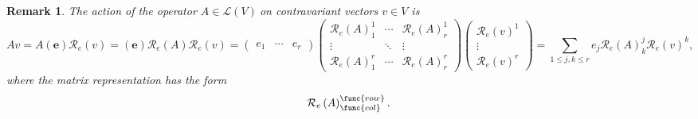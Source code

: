 \documentclass[aps,preprint]{revtex4}
\newtheorem{remark}[theorem]{Remark}
\begin{document}
\begin{remark}
The action of the operator $A\in \mathcal{L}\left( V\right) \ $on
contravariant vectors $v\in V$ is 
\begin{equation}
Av=A\left( \boldsymbol{e}\right) \mathcal{R}_{e}\left( v\right) =\left( 
\boldsymbol{e}\right) \mathcal{R}_{e}\left( A\right) \mathcal{R}_{e}\left(
v\right) =\left( 
\begin{array}{ccc}
e_{1} & \cdots & e_{r}%
\end{array}%
\right) \left( 
\begin{array}{ccc}
\mathcal{R}_{e}\left( A\right) _{1}^{1} & \cdots & \mathcal{R}_{e}\left(
A\right) _{r}^{1} \\ 
\vdots & \ddots & \vdots \\ 
\mathcal{R}_{e}\left( A\right) _{1}^{r} & \cdots & \mathcal{R}_{e}\left(
A\right) _{r}^{r}%
\end{array}%
\right) \left( 
\begin{array}{c}
\mathcal{R}_{e}\left( v\right) ^{1} \\ 
\vdots \\ 
\mathcal{R}_{e}\left( v\right) ^{r}%
\end{array}%
\right) =\sum_{1\leq j,k\leq r}e_{j}\mathcal{R}_{e}\left( A\right) _{k}^{j}%
\mathcal{R}_{e}\left( v\right) ^{k},
\end{equation}%
where the matrix representation has the form 
\begin{equation}
\mathcal{R}_{e}\left( A\right) _{\func{col}}^{\func{row}}.
\end{equation}
\end{remark}
\end{document}
